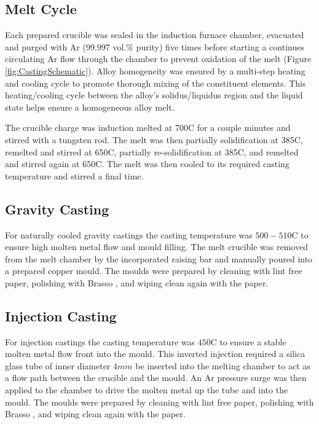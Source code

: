 \documentclass[a4paper,12pt,oneside]{report}%
\begin{document}
\subsection{Melt Cycle}

Each prepared crucible was sealed in the induction furnace chamber, evacuated and purged with Ar (99.997 vol.\% purity) five times before starting a continues circulating Ar flow through the chamber to prevent oxidation of the melt (Figure \ref{fig:CastingSchematic}). Alloy homogeneity was ensured by a multi-step heating and cooling cycle to promote thorough mixing of the constituent elements. This heating/cooling cycle between the alloy's solidus/liquidus region and the liquid state helps ensure a homogeneous alloy melt.

The crucible charge was induction melted at 700\degree C for a couple minutes and stirred with a tungsten rod. The melt was then partially solidification at 385\degree C, remelted and stirred at 650\degree C, partially re-solidification at 385\degree C, and remelted and stirred again at 650\degree C. The melt was then cooled to its required casting temperature and stirred a final time.

\subsection{Gravity Casting}

For naturally cooled gravity castings the casting temperature was $500- 510$\degree C to ensure high molten metal flow and mould filling. The melt crucible was removed from the melt chamber by the incorporated raising bar and manually poured into a prepared copper mould. The moulds were prepared by cleaning with lint free paper, polishing with Brasso \textcopyright, and wiping clean again with the paper. 

\subsection{Injection Casting}

For injection castings the casting temperature was $450$\degree C to ensure a stable molten metal flow front into the mould. This inverted injection required a silica glass tube of inner diameter $4mm$ be inserted into the melting chamber to act as a flow path between the crucible and the mould. An Ar pressure surge was then applied to the chamber to drive the molten metal up the tube and into the mould. The moulds were prepared by cleaning with lint free paper, polishing with Brasso \textcopyright, and wiping clean again with the paper. 
\end{document}
